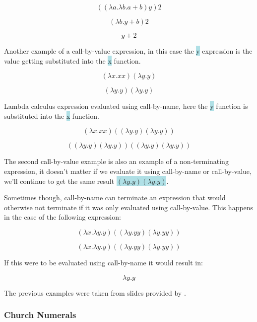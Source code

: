 \documentclass{article}
\begin{document}
\[((\lambda a. \lambda b. a + b)y)2\]

\[(\lambda b. y + b) 2\]

\[y +2\] \newline

\break

Another example of a call-by-value expression, in this case the \colorbox{powderblue}{y} expression is the value getting substituted into the \colorbox{powderblue}{x} function. \newline

\[(\lambda x. x x)(\lambda y. y)\]

\[(\lambda y. y)(\lambda y. y)\] \newline

Lambda calculus expression evaluated using call-by-name, here the \colorbox{powderblue}{y} function is substituted into the \colorbox{powderblue}{x} function. \newline

\[(\lambda x. x x)((\lambda y. y)(\lambda y. y))\]

\[((\lambda y. y)(\lambda y. y))((\lambda y. y)(\lambda y. y))\] \newline

The second call-by-value example is also an example of a non-terminating expression, it doesn't matter if we evaluate it using call-by-name or call-by-value, we'll continue to get the same result \colorbox{powderblue}{$(\lambda y. y)(\lambda y. y)$}.

Sometimes though, call-by-name can terminate an expression that would otherwise not terminate if it was only evaluated using call-by-value. This happens in the case of the following expression:\newline

\[(\lambda x. \lambda y. y)((\lambda y. yy)(\lambda y. yy))\]

\[(\lambda x. \lambda y. y)((\lambda y. yy)(\lambda y. yy))\] \newline

If this were to be evaluated using call-by-name it would result in:\newline

\[\lambda y. y\] \newline

The previous examples were taken from slides provided by \cite{CCL}.

\subsubsection{Church Numerals}
\end{document}
